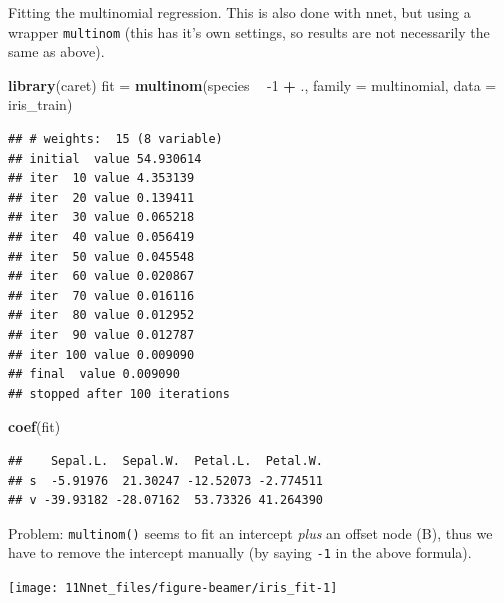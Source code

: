 \documentclass[10pt,ignorenonframetext,]{beamer}
\newenvironment{Shaded}{\begin{snugshade}}{\end{snugshade}}
\newcommand{\DataTypeTok}[1]{\textcolor[rgb]{0.13,0.29,0.53}{#1}}
\newcommand{\DecValTok}[1]{\textcolor[rgb]{0.00,0.00,0.81}{#1}}
\newcommand{\KeywordTok}[1]{\textcolor[rgb]{0.13,0.29,0.53}{\textbf{#1}}}
\newcommand{\NormalTok}[1]{#1}
\newcommand{\OperatorTok}[1]{\textcolor[rgb]{0.81,0.36,0.00}{\textbf{#1}}}
\newcommand{\StringTok}[1]{\textcolor[rgb]{0.31,0.60,0.02}{#1}}
\begin{document}
\begin{frame}[fragile]

Fitting the multinomial regression. This is also done with nnet, but
using a wrapper \texttt{multinom} (this has it's own settings, so
results are not necessarily the same as above).

\scriptsize

\begin{Shaded}
\begin{Highlighting}[]
\KeywordTok{library}\NormalTok{(caret)}
\NormalTok{fit =}\StringTok{ }\KeywordTok{multinom}\NormalTok{(species }\OperatorTok{~}\StringTok{ }\DecValTok{-1} \OperatorTok{+}\StringTok{ }\NormalTok{., }\DataTypeTok{family =}\NormalTok{ multinomial, }\DataTypeTok{data =}\NormalTok{ iris_train)}
\end{Highlighting}
\end{Shaded}

\begin{verbatim}
## # weights:  15 (8 variable)
## initial  value 54.930614 
## iter  10 value 4.353139
## iter  20 value 0.139411
## iter  30 value 0.065218
## iter  40 value 0.056419
## iter  50 value 0.045548
## iter  60 value 0.020867
## iter  70 value 0.016116
## iter  80 value 0.012952
## iter  90 value 0.012787
## iter 100 value 0.009090
## final  value 0.009090 
## stopped after 100 iterations
\end{verbatim}

\begin{Shaded}
\begin{Highlighting}[]
\KeywordTok{coef}\NormalTok{(fit)}
\end{Highlighting}
\end{Shaded}

\begin{verbatim}
##    Sepal.L.  Sepal.W.  Petal.L.  Petal.W.
## s  -5.91976  21.30247 -12.52073 -2.774511
## v -39.93182 -28.07162  53.73326 41.264390
\end{verbatim}

\end{frame}

\begin{frame}[fragile]

Problem: \texttt{multinom()} seems to fit an intercept \emph{plus} an
offset node (B), thus we have to remove the intercept manually (by
saying \texttt{-1} in the above formula).

\begin{center}\texttt{[image: 11Nnet\_files/figure-beamer/iris\_fit-1]} \end{center}

\end{frame}
\end{document}
